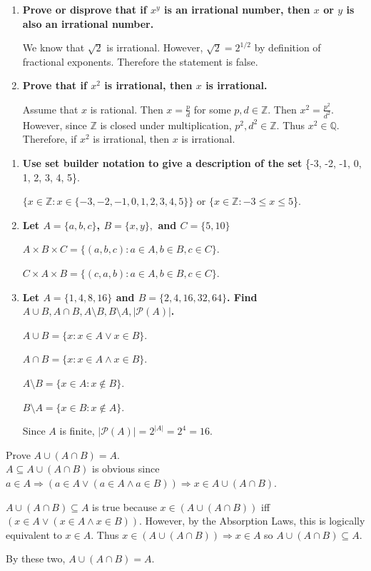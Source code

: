 \documentclass[letterpaper, 12pt]{article}
\begin{document}
\begin{enumerate}
    \item \textbf{Prove or disprove that if $x^y$ is an irrational number, then $x$ or $y$ is also an irrational number.}
    
        We know that $\sqrt{2}$ is irrational. However, $\sqrt{2} = 2^{1/2}$ by definition of fractional exponents. Therefore the statement is false.
        
    \item \textbf{Prove that if $x^2$ is irrational, then $x$ is irrational.}
    
        Assume that $x$ is rational. Then $x = \frac{p}{d}$ for some $p,d\in\mathbb{Z}$. Then $x^2 = \frac{p^2}{d^2}$. However, since $\mathbb{Z}$ is closed under multiplication, $p^2,d^2\in\mathbb{Z}$. Thus $x^2\in\mathbb{Q}$. Therefore, if $x^2$ is irrational, then $x$ is irrational.
\end{enumerate}

\begin{enumerate}
    \item \textbf{Use set builder notation to give a description of the set} \{-3, -2, -1, 0, 1, 2, 3, 4, 5\}.
    
        $\{x\in\mathbb{Z} : x\in\{-3, -2, -1, 0, 1, 2, 3, 4, 5\}\}$ or $\{x\in\mathbb{Z} : -3 \leq x \leq 5$\}.
    
    \item \textbf{Let $A = \{a,b,c\}$, $B=\{x,y\},$ and $C = \{5,10\}$}
    
        $A\times B\times C = \{(a,b,c) : a\in A, b\in B, c\in C\}$.
        
        $C\times A\times B = \{(c,a,b) : a\in A, b\in B, c\in C\}$.
    
    \item \textbf{Let $A = \{1, 4, 8, 16\}$ and $B = \{2, 4, 16, 32, 64\}$. Find $A\cup B, A\cap B, A\setminus B, B\setminus A,  |\mathcal{P}(A)|$.}
    
        $A\cup B =\{ x : x\in A \lor x\in B\}$.
        
        $A\cap B = \{ x : x\in A \land x\in B\}$.
        
        $A\setminus B = \{ x\in A : x\not\in B\}$.
        
        $B\setminus A = \{ x\in B : x\not\in A\}$.
        
        Since $A$ is finite, $|\mathcal{P}(A)| = 2^{|A|} = 2^4 = 16$.
        
\end{enumerate}

\noindent Prove $A\cup (A\cap B) = A$.\\

$A\subseteq A\cup (A\cap B)$ is obvious since $a\in A \Rightarrow (a\in A \lor (a\in A \land a\in B)) \Rightarrow x\in A\cup (A\cap B)$.

$A\cup (A\cap B)\subseteq A$ is true because $x\in (A\cup (A\cap B))$ iff $(x\in A \lor (x\in A \land x\in B))$. However, by the Absorption Laws, this is logically equivalent to $x\in A$. Thus $x\in (A\cup (A\cap B)) \Rightarrow x\in A$ so $A\cup (A\cap B)\subseteq A$.

By these two, $A\cup (A\cap B) = A$.
\end{document}
